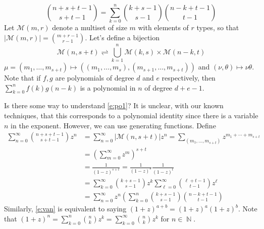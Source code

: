\documentclass[11pt, a4paper]{memoir}
\DeclareMathOperator{\N}{{\mathbb{N}}}
\theoremstyle{change}
\theoremstyle{plain}
\theoremstyle{nonumberplain}
\numberwithin{equation}{section}
\begin{document}
\begin{enumerate}
\begin{equation*}
            \binom{n+s+t-1}{s+t-1}=\sum_{k=0}^n\binom{k+s-1}{s-1}\binom{n-k+t-1}{t-1}
        \end{equation*}
        Let $\mathcal{M}(m,r)$ denote a multiset of size $m$ with elements of $r$ types, so that $|\mathcal{M}(m,r)|=\binom{m+r-1}{r-1}$.
        Let's define a bijection
        \begin{equation}\label{e:po1}
            \mathcal{M}(n,s+t)\rightleftharpoons\bigcup_{k=1}^n\mathcal{M}(k,s)\times\mathcal{M}(n-k,t)
        \end{equation}
        $\mu=(m_1,\ldots,m_{s+t})\mapsto ((m_1,\ldots,m_s),(m_{s+1},\ldots,m_{s+t}))$ and $(\nu,\theta)\mapsto \nu\theta$.
        Note that if $f,g$ are polynomials of degree $d$ and $e$ respectively, then $\sum_{k=0}^nf(k)g(n-k)$ is a polynomial in $n$ of degree $d+e-1$.

        Is there some way to understand  \cref{e:po1}?
        It is unclear, with our known techniques, that this corresponds to a polynomial identity since there is a variable $n$ in the exponent.
        However, we can use generating functions.
        Define
        \begin{align*}
            \sum_{n=0}^\infty\binom{n+s+t-1}{s+t-1}z^n &= \sum_{n=0}^\infty|\mathcal{M}(n,s+t)|z^n= \sum_{(m_1,\ldots,m_{s+t})}z^{m_1+\cdots+m_{s+t}}\\
                                                       &= \left(\sum_{m=0}^\infty z^m\right)^{s+t}\\
                                                       &= \frac{1}{(1-z)^{s+t}}=\frac{1}{(1-z)^s}\frac{1}{(1-z)^t}\\
                                                       &= \sum_{k=0}^\infty\binom{k+s-1}{s-1}z^k\sum_{\ell=0}^\infty\binom{\ell+t-1}{t-1}z^\ell\\
                                                       &= \sum_{n=0}^\infty z^n\left(\sum_{k=0}^n\binom{k+s-1}{s-1}\binom{n-k+t-1}{t-1}
        \end{align*}
        Similarly, \cref{e:van} is equivalent to saying $(1+z)^{a+b}=(1+z)^a(1+z)^b$.
        Note that $(1+z)^n=\sum_{k=0}^n\binom{n}{k}z^k=\sum_{k=0}^\infty\binom{n}{k}z^k$ for $n\in\N$.


\end{enumerate}
\end{document}
